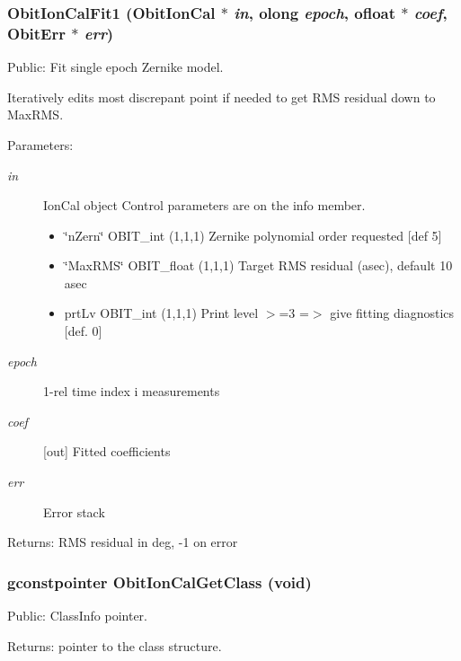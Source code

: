 \subsubsection{ Obit\-Ion\-Cal\-Fit1 ({\bf Obit\-Ion\-Cal} $\ast$ {\em in}, {\bf olong} {\em epoch}, {\bf ofloat} $\ast$ {\em coef}, {\bf Obit\-Err} $\ast$ {\em err})}\label{ObitIonCal_8h_a13}


Public: Fit single epoch Zernike model. 

Iteratively edits most discrepant point if needed to get RMS residual down to Max\-RMS. \begin{Desc}
\item[Parameters:]
\begin{description}
\item[{\em in}]Ion\-Cal object Control parameters are on the info member. \begin{itemize}
\item \char`\"{}n\-Zern\char`\"{} OBIT\_\-int (1,1,1) Zernike polynomial order requested [def 5] \item \char`\"{}Max\-RMS\char`\"{} OBIT\_\-float (1,1,1) Target RMS residual (asec), default 10 asec \item prt\-Lv OBIT\_\-int (1,1,1) Print level $>$=3 =$>$ give fitting diagnostics [def. 0] \end{itemize}
\item[{\em epoch}]1-rel time index i measurements \item[{\em coef}][out] Fitted coefficients \item[{\em err}]Error stack \end{description}
\end{Desc}
\begin{Desc}
\item[Returns:]RMS residual in deg, -1 on error \end{Desc}
\subsubsection{\setlength{\rightskip}{0pt plus 5cm}gconstpointer Obit\-Ion\-Cal\-Get\-Class (void)}\label{ObitIonCal_8h_a7}


Public: Class\-Info pointer. 

\begin{Desc}
\item[Returns:]pointer to the class structure. \end{Desc}
